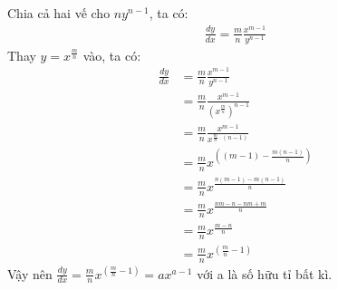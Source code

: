 \documentclass[15pt,a4paper]{article}
\begin{document}
Chia cả hai vế cho $n y^{n-1}$, ta có:
\begin{align*}
	\frac{dy}{dx} = \frac{m}{n} \frac{x^{m-1}}{y^{n-1}}
\end{align*}
Thay $y = x^{\frac{m}{n}}$ vào, ta có:
\begin{align*}
	\frac{dy}{dx} &= \frac{m}{n} \frac{x^{m-1}}{y^{n-1}}\\
	&= \frac{m}{n} \frac{x^{m-1}}{(x^{\frac{m}{n}})^{n-1}}\\
	&= \frac{m}{n} \frac{x^{m-1}}{x^{\frac{m}{n} \cdot (n-1)}}\\
	&= \frac{m}{n} x^{\left((m-1) - \frac{m (n-1)}{n}\right)}\\
	&= \frac{m}{n} x^{\frac{n (m-1) - m (n-1)}{n}}\\
	&= \frac{m}{n} x^{\frac{nm - n - nm + m}{n}}\\
	&= \frac{m}{n} x^{\frac{m - n}{n}}\\
	&= \frac{m}{n} x^{\left(\frac{m}{n} - 1\right)}
\end{align*}
Vậy nên $\frac{dy}{dx} = \frac{m}{n} x^{\left(\frac{m}{n} - 1\right)} = a x^{a - 1}$ với a là số hữu tỉ bất kì.
\end{document}
